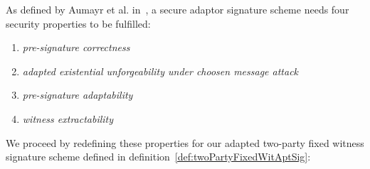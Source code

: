 \begin{definition}
    As defined by Aumayr et al. in~\cite{aumayr2020bitcoinchannels}, a secure adaptor signature scheme needs four security properties to be fulfilled:
    \begin{enumerate}
        \item \textit{pre-signature correctness}
        \item \textit{adapted existential unforgeability under choosen message attack}
        \item \textit{pre-signature adaptability}
        \item \textit{witness extractability}
    \end{enumerate}
\end{definition}

We proceed by redefining these properties for our adapted two-party fixed witness signature scheme defined in definition~\ref{def:twoPartyFixedWitAptSig}:

